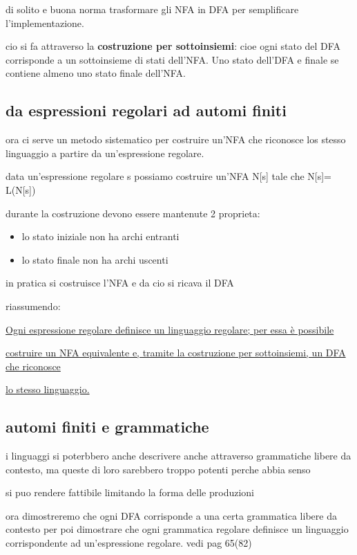 \documentclass[12pt]{article}
\begin{document}
di solito e buona norma trasformare gli NFA in DFA per semplificare l'implementazione.

cio si fa attraverso la \textbf{costruzione per sottoinsiemi}: cioe ogni stato del DFA corrisponde a un sottoinsieme di stati dell'NFA. Uno stato dell'DFA e finale se contiene almeno uno stato finale dell'NFA.

\subsection{da espressioni regolari ad automi finiti}

ora ci serve un metodo sistematico per costruire un'NFA che riconosce los stesso linguaggio a partire da un'espressione regolare.

data un'espressione regolare s possiamo costruire un'NFA N[s] tale che N[s]= L(N[s])

durante la costruzione devono essere mantenute 2 proprieta:
\begin{itemize}
    \item lo stato iniziale non ha archi entranti
    \item lo stato finale non ha archi uscenti
\end{itemize}

in pratica si costruisce l'NFA e da cio si ricava il DFA

riassumendo:

\underline{Ogni espressione regolare definisce un linguaggio regolare; per essa è possibile}

\underline{costruire un NFA equivalente e, tramite la costruzione per sottoinsiemi, un DFA che riconosce}

\underline{lo stesso linguaggio.}

\subsection{automi finiti e grammatiche}

i linguaggi si poterbbero anche descrivere anche attraverso grammatiche libere da contesto, ma queste di loro sarebbero troppo potenti perche abbia senso

si puo rendere fattibile limitando la forma delle produzioni

ora dimostreremo che ogni DFA corrisponde a una certa grammatica libere da contesto
per poi dimostrare che ogni grammatica regolare definisce un linguaggio
corrispondente ad un'espressione regolare.
vedi  pag 65(82)
\end{document}

